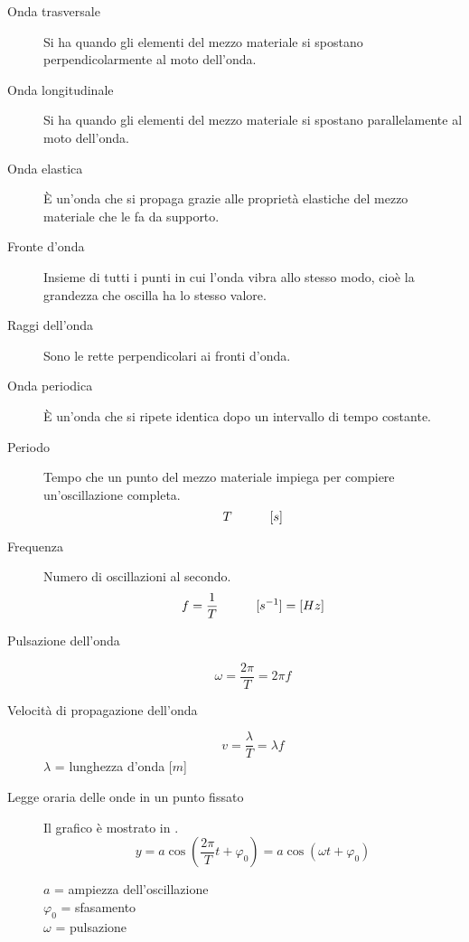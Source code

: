 \documentclass[a4paper,11pt,italian]{article}
\begin{document}
\begin{description}
  \item[Onda trasversale] 
  Si ha quando gli elementi del mezzo materiale si spostano perpendicolarmente al moto dell'onda.
  
  \item[Onda longitudinale] 
  Si ha quando gli elementi del mezzo materiale si spostano parallelamente al moto dell'onda.
  
  \item[Onda elastica] 
  È un'onda che si propaga grazie alle proprietà elastiche del mezzo materiale che le fa da supporto.
  
  \item[Fronte d'onda] 
  Insieme di tutti i punti in cui l'onda vibra allo stesso modo, cioè la grandezza che oscilla ha lo stesso valore.
  
  \item[Raggi dell'onda] 
  Sono le rette perpendicolari ai fronti d'onda.
  
  \item[Onda periodica] 
  È un'onda che si ripete identica dopo un intervallo di tempo costante.
  
  \item[Periodo] 
  Tempo che un punto del mezzo materiale impiega per compiere un'oscillazione completa.
  \[ T \hspace*{3em} [s] \]
  
  \item[Frequenza] 
  Numero di oscillazioni al secondo.
  \[ f = \frac{1}{T} \hspace*{3em} [s^{-1}]=[ Hz] \]
  
  \item[Pulsazione dell'onda]
  \[ \omega = \frac{2\pi}{T} = 2\pi f \]
  
  \item[Velocità di propagazione dell'onda] 
  \[ v = \frac{\lambda}{T} = \lambda f  \]
  $ \lambda $ = lunghezza d'onda [$ m $]
  
  \item[Legge oraria delle onde in un punto fissato] 
  Il grafico è mostrato in .
  \[ y = a \cos\left(\frac{2 \pi}{T}t + \varphi_0\right) = a \cos\left(\omega t + \varphi_0\right) \]
  \begin{multicols}{2}
  $ a $ = ampiezza dell'oscillazione\\
  $ \varphi_0 $ = sfasamento\\
  $ \omega $ = pulsazione
  \end{multicols}
  

\end{description}
\end{document}
